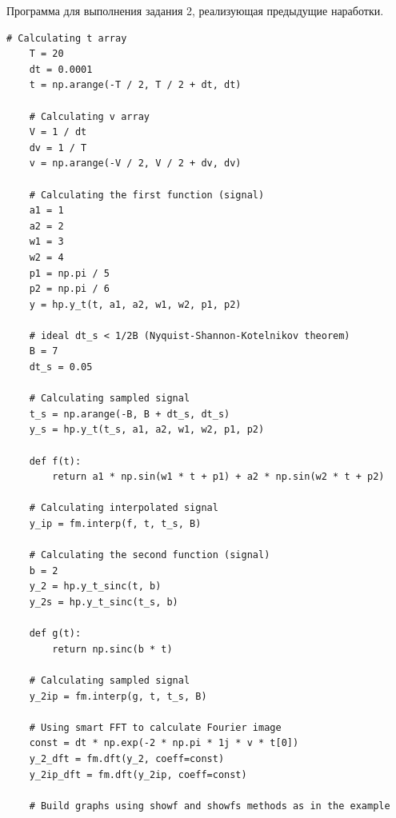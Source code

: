 \documentclass[a4paper, 12pt]{article}
\begin{document}
    Программа для выполнения задания 2, реализующая предыдущие наработки.
    \begin{lstlisting}[label=aaaa, caption={Реализация задания 2}]
    # Calculating t array
    T = 20
    dt = 0.0001
    t = np.arange(-T / 2, T / 2 + dt, dt)

    # Calculating v array
    V = 1 / dt
    dv = 1 / T
    v = np.arange(-V / 2, V / 2 + dv, dv)

    # Calculating the first function (signal)
    a1 = 1
    a2 = 2
    w1 = 3
    w2 = 4
    p1 = np.pi / 5
    p2 = np.pi / 6
    y = hp.y_t(t, a1, a2, w1, w2, p1, p2)

    # ideal dt_s < 1/2B (Nyquist-Shannon-Kotelnikov theorem)
    B = 7
    dt_s = 0.05

    # Calculating sampled signal
    t_s = np.arange(-B, B + dt_s, dt_s)
    y_s = hp.y_t(t_s, a1, a2, w1, w2, p1, p2)

    def f(t):
        return a1 * np.sin(w1 * t + p1) + a2 * np.sin(w2 * t + p2)

    # Calculating interpolated signal
    y_ip = fm.interp(f, t, t_s, B)

    # Calculating the second function (signal)
    b = 2
    y_2 = hp.y_t_sinc(t, b)
    y_2s = hp.y_t_sinc(t_s, b)

    def g(t):
        return np.sinc(b * t)

    # Calculating sampled signal
    y_2ip = fm.interp(g, t, t_s, B)

    # Using smart FFT to calculate Fourier image
    const = dt * np.exp(-2 * np.pi * 1j * v * t[0])
    y_2_dft = fm.dft(y_2, coeff=const)
    y_2ip_dft = fm.dft(y_2ip, coeff=const)

    # Build graphs using showf and showfs methods as in the example
    \end{lstlisting}
\end{document}
